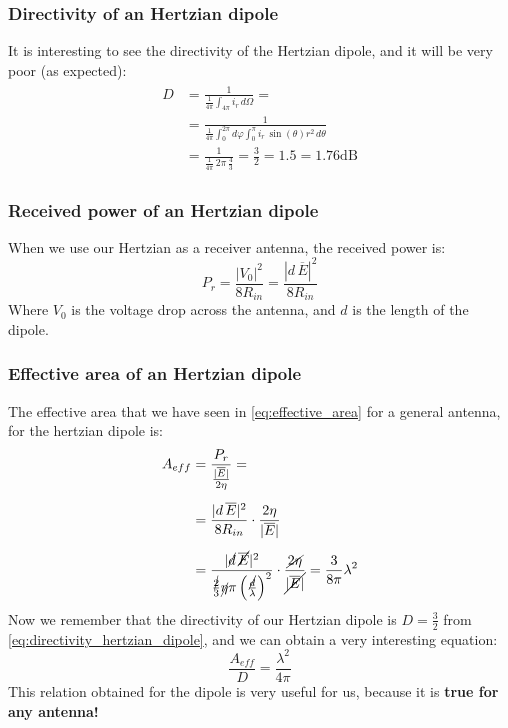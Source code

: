 \subsubsection*{Directivity of an Hertzian dipole}
It is interesting to see the directivity of the Hertzian dipole, and it will be very poor (as expected):
\begin{align}\label{eq:directivity_hertzian_dipole}
    \begin{split}
        D&=\frac{1}{\frac{1}{4\pi} \int_{4\pi}i_r\,d\Omega}=\\[5pt]
        &=\frac{1}{\frac{1}{4\pi}\int_0^{2\pi}d\varphi \int_0^\pi i_r\,\sin(\theta)r^2\,d\theta}\\[5pt]
        &=\frac{1}{\frac{1}{4\pi}\,2\pi\,\frac{4}{3}}=\frac{3}{2}=1.5=1.76\si{\deci\bel}
    \end{split}
\end{align}
\subsubsection*{Received power of an Hertzian dipole}
When we use our Hertzian as a receiver antenna, the received power is:
\begin{equation}\label{eq:hertzian_received_pow}
    P_r=\frac{|V_0|^2}{8R_{in}}=\frac{|d\,\overline{E}|^2}{8R_{in}}
\end{equation}
Where $V_0$ is the voltage drop across the antenna, and $d$ is the length of the dipole.
\subsubsection*{Effective area of an Hertzian dipole}
The effective area that we have seen in \cref{eq:effective_area} for a general antenna, for the hertzian dipole is:
\begin{align}\label{eq:effective_area_hertzian_dipole}
    \begin{split}
        A_{eff}&=\frac{P_r}{\frac{|\overline{E}|}{2\eta}}=\\[5pt]
        &=\frac{|d\,\overline{E}|^2}{8R_{in}}\cdot \frac{2\eta}{|\overline{E}|}\\[5pt]
        &=\frac{|\cancel{d}\,\cancel{\overline{E}}|^2}{\frac{\cancel{2}}{3}\cancel{\eta}\pi\left(\frac{\cancel{d}}{\lambda}\right)^2}\cdot \frac{\cancel{2\eta}}{\cancel{|\overline{E}|}}=\frac{3}{8\pi}\lambda^2
    \end{split}
\end{align}
Now we remember that the directivity of our Hertzian dipole is $D=\frac{3}{2}$ from \cref{eq:directivity_hertzian_dipole}, and we can obtain a very interesting equation:
\begin{equation}\label{eq:true_for_every_antenna}
    \frac{A_{eff}}{D}=\frac{\lambda^2}{4\pi}
\end{equation}
This relation obtained for the dipole is very useful for us, because it is \textbf{true for any antenna!}

